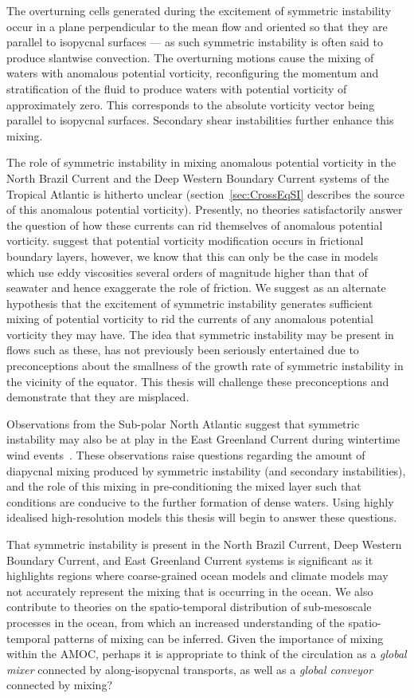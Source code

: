 The overturning cells generated during the excitement of symmetric instability occur in a plane perpendicular to the mean flow and oriented so that they are parallel to isopycnal surfaces --- as such symmetric instability is often said to produce slantwise convection. The overturning motions cause the mixing of waters with anomalous potential vorticity, reconfiguring the momentum and stratification of the fluid to produce waters with potential vorticity of approximately zero. This corresponds to the absolute vorticity vector being parallel to isopycnal surfaces. Secondary shear instabilities further enhance this mixing.

The role of symmetric instability in mixing anomalous potential vorticity in the North Brazil Current and the Deep Western Boundary Current systems of the Tropical Atlantic is hitherto unclear (section~\ref{sec:CrossEqSI} describes the source of this anomalous potential vorticity). Presently, no theories satisfactorily answer the question of how these currents can rid themselves of anomalous potential vorticity. \citet{Edwards1998I, Edwards1998II} suggest that potential vorticity modification occurs in frictional boundary layers, however, we know that this can only be the case in models which use eddy viscosities several orders of magnitude higher than that of seawater and hence exaggerate the role of friction. We suggest as an alternate hypothesis that the excitement of symmetric instability generates sufficient mixing of potential vorticity to rid the currents of any anomalous potential vorticity they may have. The idea that symmetric instability may be present in flows such as these, has not previously been seriously entertained due to preconceptions about the smallness of the growth rate of symmetric instability in the vicinity of the equator. This thesis will challenge these preconceptions and demonstrate that they are misplaced.

Observations from the Sub-polar North Atlantic suggest that symmetric instability may also be at play in the East Greenland Current during wintertime wind events~\citep{LeBras2022}. These observations raise questions regarding the amount of diapycnal mixing produced by symmetric instability (and secondary instabilities), and the role of this mixing in pre-conditioning the mixed layer such that conditions are conducive to the further formation of dense waters. Using highly idealised high-resolution models this thesis will begin to answer these questions.

That symmetric instability is present in the North Brazil Current, Deep Western Boundary Current, and East Greenland Current systems is significant as it highlights regions where coarse-grained ocean models and climate models may not accurately represent the mixing that is occurring in the ocean. We also contribute to theories on the spatio-temporal distribution of sub-mesoscale processes in the ocean, from which an increased understanding of the spatio-temporal patterns of mixing can be inferred. Given the importance of mixing within the AMOC, perhaps it is appropriate to think of the circulation as a \textit{global mixer} connected by along-isopycnal transports, as well as a \textit{global conveyor} connected by mixing?

